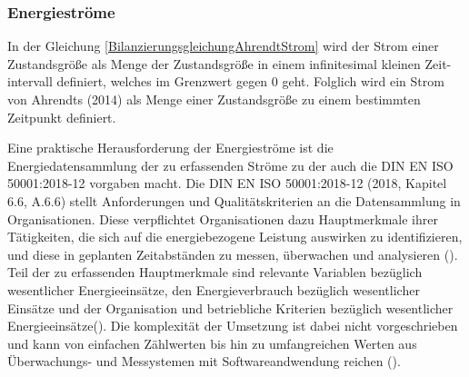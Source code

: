 
\subsubsection{Energieströme}
In der Gleichung \eqref{BilanzierungsgleichungAhrendtStrom} wird der Strom einer Zustandsgröße als Menge der Zustandsgröße in einem infinitesimal kleinen Zeit-
intervall definiert, welches im Grenzwert gegen 0 geht. Folglich wird ein Strom von Ahrendts (2014) als Menge einer Zustandsgröße zu einem bestimmten Zeitpunkt 
definiert. 



Eine praktische Herausforderung der Energieströme ist die Energiedatensammlung der zu erfassenden Ströme zu der auch die DIN EN ISO 50001:2018-12 vorgaben macht. 
Die DIN EN ISO 50001:2018-12 (2018, Kapitel 6.6, A.6.6) stellt Anforderungen und Qualitätskriterien an die Datensammlung in Organisationen.
Diese verpflichtet Organisationen dazu Hauptmerkmale ihrer Tätigkeiten, die sich auf die energiebezogene Leistung auswirken zu identifizieren, und diese in geplanten 
Zeitabständen zu messen, überwachen und analysieren (\cite[S. 23]{DIN50001.2018}).
Teil der zu erfassenden Hauptmerkmale sind relevante Variablen bezüglich wesentlicher Energieeinsätze, den Energieverbrauch bezüglich wesentlicher Einsätze 
und der Organisation und betriebliche Kriterien bezüglich wesentlicher Energieeinsätze(\cite[S. 23]{DIN50001.2018}).
Die komplexität der Umsetzung ist dabei nicht vorgeschrieben und kann von einfachen Zählwerten bis hin zu umfangreichen Werten aus Überwachungs- und Messystemen mit 
Softwareandwendung reichen (\cite[S. 36]{DIN50001.2018}).



